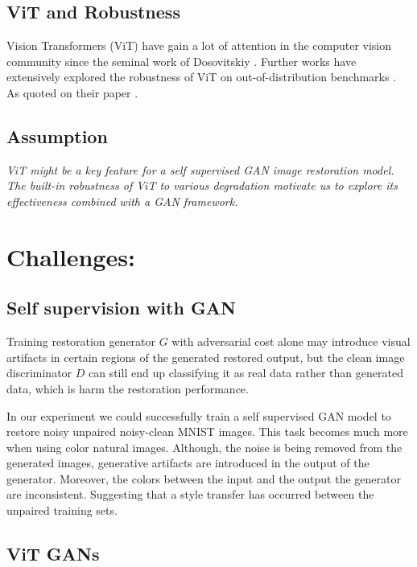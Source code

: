 \subsection*{ViT and Robustness}
\par Vision Transformers (ViT) have gain a lot of attention in the computer vision community since the seminal work of Dosovitskiy \etal \cite{dosovitskiy2020image}. Further works \cite{bai2021transformers} have extensively explored the robustness of ViT on out-of-distribution benchmarks \cite{hendrycks2018benchmarking}. As quoted on their paper
.
\subsection*{Assumption}
\par \emph{ViT might be a key feature for a self supervised GAN image restoration model. The built-in robustness of ViT to various degradation motivate us to explore its effectiveness combined with a GAN framework.}
\section{Challenges:}
\subsection*{Self supervision with GAN}
\par Training restoration generator $G$ with adversarial cost alone may introduce visual artifacts in certain regions of the generated restored output, but the clean image discriminator $D$ can still end up classifying it as real data rather than generated data, which is harm the restoration performance.
\par In our experiment we could successfully train a self supervised GAN model to restore noisy unpaired noisy-clean MNIST images. This task becomes much more when using color natural images. Although, the noise is being removed from the generated images, generative artifacts are introduced in the output of the generator. Moreover, the colors between the input and the output the generator are inconsistent. Suggesting that a style transfer has occurred between the unpaired training sets.
\subsection*{ViT GANs}

